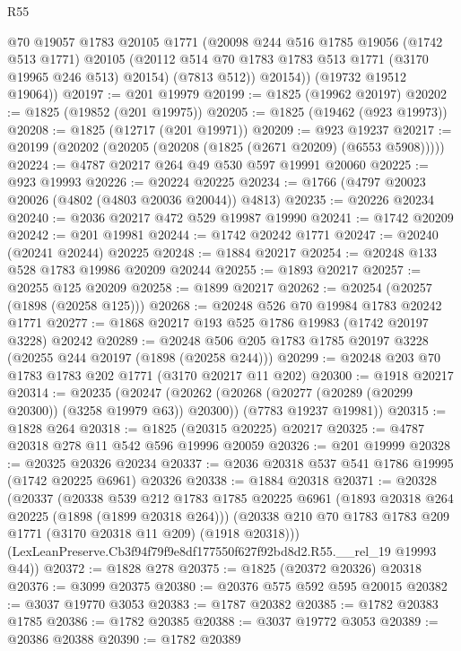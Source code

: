 \begin{lexlean}{R55}
\begin{coremodule}
          @70
          @19057
          @1783
          @20105
          @1771
          (@20098
            @244
            @516
            @1785
            @19056
            (@1742 @513 @1771)
            @20105
            (@20112 @514 @70 @1783 @1783 @513 @1771 (@3170 @19965 @246 @513) @20154)
            (@7813 @512))
          @20154))
      (@19732 @19512 @19064))
@20197 := @201 @19979
@20199 := @1825 (@19962 @20197)
@20202 := @1825 (@19852 (@201 @19975))
@20205 := @1825 (@19462 (@923 @19973))
@20208 := @1825 (@12717 (@201 @19971))
@20209 := @923 @19237
@20217 := @20199 (@20202 (@20205 (@20208 (@1825 (@2671 @20209) (@6553 @5908)))))
@20224 := @4787 @20217 @264 @49 @530 @597 @19991 @20060
@20225 := @923 @19993
@20226 := @20224 @20225
@20234 := @1766 (@4797 @20023 @20026 (@4802 (@4803 @20036 @20044)) @4813)
@20235 := @20226 @20234
@20240 := @2036 @20217 @472 @529 @19987 @19990
@20241 := @1742 @20209
@20242 := @201 @19981
@20244 := @1742 @20242 @1771
@20247 := @20240 (@20241 @20244) @20225
@20248 := @1884 @20217
@20254 := @20248 @133 @528 @1783 @19986 @20209 @20244
@20255 := @1893 @20217
@20257 := @20255 @125 @20209
@20258 := @1899 @20217
@20262 := @20254 (@20257 (@1898 (@20258 @125)))
@20268 := @20248 @526 @70 @19984 @1783 @20242 @1771
@20277 := @1868 @20217 @193 @525 @1786 @19983 (@1742 @20197 @3228) @20242
@20289 := @20248 @506 @205 @1783 @1785 @20197 @3228 (@20255 @244 @20197 (@1898 (@20258 @244)))
@20299 := @20248 @203 @70 @1783 @1783 @202 @1771 (@3170 @20217 @11 @202)
@20300 := @1918 @20217
@20314 := @20235
    (@20247
      (@20262 (@20268 (@20277 (@20289 (@20299 @20300)) (@3258 @19979 @63)) @20300))
      (@7783 @19237 @19981))
@20315 := @1828 @264
@20318 := @1825 (@20315 @20225) @20217
@20325 := @4787 @20318 @278 @11 @542 @596 @19996 @20059
@20326 := @201 @19999
@20328 := @20325 @20326 @20234
@20337 := @2036 @20318 @537 @541 @1786 @19995 (@1742 @20225 @6961) @20326
@20338 := @1884 @20318
@20371 := @20328
    (@20337
      (@20338
        @539
        @212
        @1783
        @1785
        @20225
        @6961
        (@1893 @20318 @264 @20225 (@1898 (@1899 @20318 @264)))
        (@20338 @210 @70 @1783 @1783 @209 @1771 (@3170 @20318 @11 @209) (@1918 @20318)))
      (LexLeanPreserve.Cb3f94f79f9e8df177550f627f92bd8d2.R55.__rel_19 @19993 @44))
@20372 := @1828 @278
@20375 := @1825 (@20372 @20326) @20318
@20376 := @3099 @20375
@20380 := @20376 @575 @592 @595 @20015
@20382 := @3037 @19770 @3053
@20383 := @1787 @20382
@20385 := @1782 @20383 @1785
@20386 := @1782 @20385
@20388 := @3037 @19772 @3053
@20389 := @20386 @20388
@20390 := @1782 @20389

\end{coremodule}
\end{lexlean}
